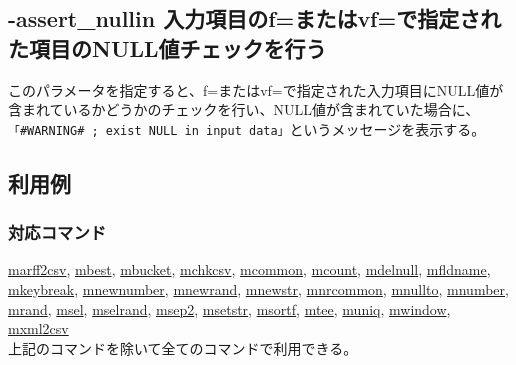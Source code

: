 

%

\subsection{-assert\_nullin 入力項目のf=またはvf=で指定された項目のNULL値チェックを行う \label{sect:option_assert_nullin}}

このパラメータを指定すると、f=またはvf=で指定された入力項目にNULL値が含まれているかどうかのチェックを行い、NULL値が含まれていた場合に、\verb|「#WARNING# ; exist NULL in input data」|というメッセージを表示する。

\subsection*{利用例}


\subsubsection*{対応コマンド}
\hyperref[sect:marff2csv]{marff2csv},
\hyperref[sect:mbest]{mbest},
\hyperref[sect:mbucket]{mbucket},
\hyperref[sect:mchkcsv]{mchkcsv},
\hyperref[sect:mcommon]{mcommon},
\hyperref[sect:mcount]{mcount},
\hyperref[sect:mdelnull]{mdelnull},
\hyperref[sect:mfldname]{mfldname},
\hyperref[sect:mkeybreak]{mkeybreak},
\hyperref[sect:mnewnumber]{mnewnumber},
\hyperref[sect:mnewrand]{mnewrand},
\hyperref[sect:mnewstr]{mnewstr},
\hyperref[sect:mnrcommon]{mnrcommon},
\hyperref[sect:mnullto]{mnullto},
\hyperref[sect:mnumber]{mnumber},
\hyperref[sect:mrand]{mrand},
\hyperref[sect:msel]{msel},
\hyperref[sect:mselrand]{mselrand},
\hyperref[sect:msep2]{msep2},
\hyperref[sect:msetstr]{msetstr},
\hyperref[sect:msortf]{msortf},
\hyperref[sect:mtee]{mtee},
\hyperref[sect:muniq]{muniq},
\hyperref[sect:mwindow]{mwindow},
\hyperref[sect:mxml2csv]{mxml2csv}\\
上記のコマンドを除いて全てのコマンドで利用できる。

%

